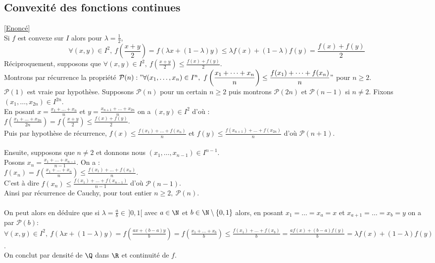 \documentclass{book}
\begin{document}
	\subsection{Convexité des fonctions continues }
	\label{Convexité des fonctions continues corrigé}
	\textcolor{blue}{\hyperref[Convexité des fonctions continues]{[Enoncé]}}\\
	Si $f$ est convexe sur $I$ alors pour $\lambda=\displaystyle\frac{1}{2}$,\\
	$$\forall (x,y)\in I^2,\ \displaystyle f\left(\frac{x+y}{2}\right)=f(\lambda x+(1-\lambda)y)\leq\lambda f(x)+(1-\lambda)f(y)=\frac{f(x)+f(y)}{2}$$
	Réciproquement, supposons que $\forall (x,y)\in I^2,\ \displaystyle f\left(\frac{x+y}{2}\right)\leq \frac{f(x)+f(y)}{2}$.\\
	Montrons par récurrence la propriété $\mathcal P(n):"\forall (x_1,\dots,x_n)\in I^n,\ \displaystyle f\left(\frac{x_1+\dots+x_n}{n}\right)\leq \frac{f(x_1)+\dots+f(x_n)}{n}"$ pour $n\geq 2$.\\
	$\mathcal P(1)$ est vraie par hypothèse. Supposons $\mathcal P(n)$ pour un certain $n\geq 2$ puis montrons $\mathcal P(2n)$ et $\mathcal P(n-1)$ si $n\ne 2$. Fixons $(x_1,\dots,x_{2n})\in I^{2n}$.\\
	En posant $x=\displaystyle\frac{x_1+\dots+x_n}{n}$ et $y=\displaystyle\frac{x_{n+1}+\dots+x_{2n}}{n}$ on a $(x,y)\in I^2$ d'où :\\
	$\displaystyle f\left(\frac{x_1+\dots+x_{2n}}{2n}\right)=f\left(\frac{x+y}{2}\right)\leq \frac{f(x)+f(y)}{2}$.\\
	Puis par hypothèse de récurrence, $f(x)\leq \displaystyle\frac{f(x_1)+\dots+f(x_n)}{n}$ et $f(y)\leq \displaystyle\frac{f(x_{n+1})+\dots+f(x_{2n})}{n}$ d'où $\mathcal P(n+1)$.\\\\
	Ensuite, supposons que $n\ne 2$ et donnons nous $(x_1,\dots,x_{n-1})\in I^{n-1}$.\\
	Posons $x_n=\displaystyle\frac{x_1+\dots+x_{n-1}}{n-1}$. On a :\\
	$\displaystyle f(x_n)=f\left(\frac{x_1+\dots+x_n}{n}\right)\leq\frac{f(x_1)+\dots+f(x_n)}{n}$.\\
	C'est à dire $f(x_n)\leq \displaystyle\frac{f(x_1)+\dots+f(x_{n-1})}{n-1}$ d'où $\mathcal P(n-1)$.\\
	Ainsi par récurrence de Cauchy, pour tout entier $n\geq 2,\ \mathcal P(n)$.\\\\
	On peut alors en déduire que si $\lambda=\displaystyle\frac{a}{b}\in\, ]0,1[$ avec $a\in \N$ et $b\in \N\setminus\{0,1\}$ alors, en posant $x_1=\dots=x_a=x$ et $x_{a+1}=\dots=x_b=y$ on a par $\mathcal P(b)$:\\
	$\forall (x,y)\in I^2,\ f(\lambda x+(1-\lambda)y)=\displaystyle f\left(\frac{ax+(b-a)y}{b}\right)=f\left(\frac{x_1+\dots+x_b}{b}\right)\leq\frac{f(x_1)+\dots+f(x_b)}{b}=\frac{af(x)+(b-a)f(y)}{b}=\lambda f(x)+(1-\lambda)f(y)$.\\
	On conclut par densité de $\Q$ dans $\R$ et continuité de $f$.
	
\end{document}
